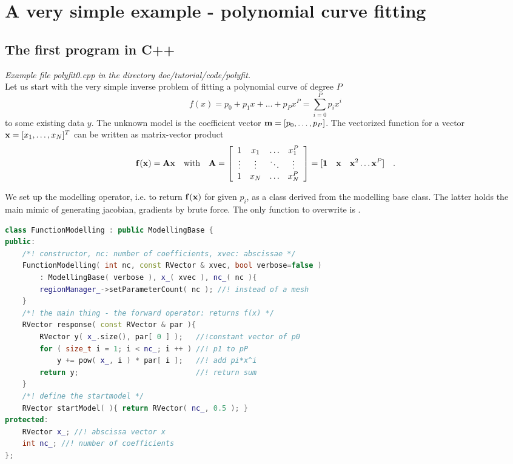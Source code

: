 \section{A very simple example - polynomial curve fitting}\label{sec:simple}
\subsection{The first program in C++}
{\em Example file polyfit0.cpp in the directory doc/tutorial/code/polyfit.}\\
Let us start with the very simple inverse problem of fitting a polynomial curve of degree $P$
\[ f(x) = p_0 +p_1 x + \ldots + p_P x^P= \sum\limits_{i=0}^{P} p_i x^i \]
to some existing data $y$. The unknown model is the coefficient vector $\mathbf{m}=[p_0,\ldots,p_P]$.
The vectorized function for a vector $\mathbf{x}=[x_1,\ldots,x_N]^T$ can be written as matrix-vector product
\begin{equation}\label{eq:yAx}
  \mathbf{f}(\mathbf{x}) = \mathbf{A} \mathbf{x} \quad\mbox{with}\quad \mathbf{A}=\left[ \begin{array}{cccc}
  1 & x_1 & \ldots & x_1^P \\ \vdots & \vdots & \ddots & \vdots \\ 1 & x_N & \ldots & x_N^P
  \end{array} \right] = [ \textbf{1}\quad \mathbf{x} \quad \mathbf{x}^2 \ldots \mathbf{x}^P ] \quad.
\end{equation}

We set up the modelling operator, i.e. to return $\mathbf{f}(\mathbf{x})$ for given $p_i$, as a class derived from the modelling base class. The latter holds the main mimic of generating jacobian, gradients by brute force. The only function to overwrite is .

\begin{lstlisting}[language=C++,morekeywords={RVector,ModellingBase}]
class FunctionModelling : public ModellingBase {
public:
    /*! constructor, nc: number of coefficients, xvec: abscissae */
    FunctionModelling( int nc, const RVector & xvec, bool verbose=false )
        : ModellingBase( verbose ), x_( xvec ), nc_( nc ){
        regionManager_->setParameterCount( nc ); //! instead of a mesh
    }
    /*! the main thing - the forward operator: returns f(x) */
    RVector response( const RVector & par ){
        RVector y( x_.size(), par[ 0 ] );   //!constant vector of p0
        for ( size_t i = 1; i < nc_; i ++ ) //! p1 to pP
            y += pow( x_, i ) * par[ i ];   //! add pi*x^i
        return y;                           //! return sum
    }
    /*! define the startmodel */
    RVector startModel( ){ return RVector( nc_, 0.5 ); }
protected:
    RVector x_; //! abscissa vector x
    int nc_; //! number of coefficients
};
\end{lstlisting}

